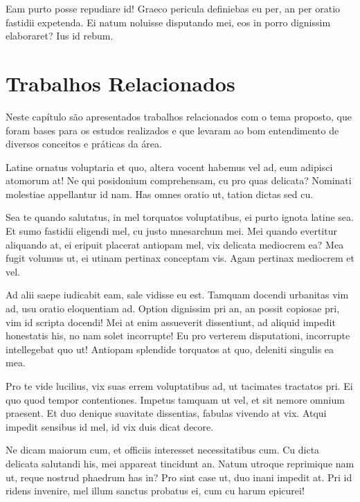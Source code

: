 \documentclass[
	12pt,				%
	openright,			%
	oneside,			%
	a4paper,			%
	english,			%
	french,				%
	spanish,			%
	brazil,				%
	]{abntex2}
\begin{document}
Eam purto posse repudiare id! Graeco pericula definiebas eu per, an per oratio fastidii expetenda. Ei natum noluisse disputando mei, eos in porro dignissim elaboraret? Ius id rebum.


\chapter{Trabalhos Relacionados}
\label{ch: trabalhos relacionados}

Neste capítulo são apresentados trabalhos relacionados com o tema proposto, que foram bases para os estudos realizados e que levaram ao bom entendimento de diversos conceitos e práticas da área.

Latine ornatus voluptaria et quo, altera vocent habemus vel ad, eum adipisci atomorum at! Ne qui posidonium comprehensam, cu pro quas delicata? Nominati molestiae appellantur id nam. Has omnes oratio ut, tation dictas sed cu.

Sea te quando salutatus, in mel torquatos voluptatibus, ei purto ignota latine sea. Et sumo fastidii eligendi mel, cu justo mnesarchum mei. Mei quando evertitur aliquando at, ei eripuit placerat antiopam mel, vix delicata mediocrem ea? Mea fugit volumus ut, ei utinam pertinax conceptam vis. Agam pertinax mediocrem et vel.

Ad alii saepe iudicabit eam, sale vidisse eu est. Tamquam docendi urbanitas vim ad, usu oratio eloquentiam ad. Option dignissim pri an, an possit copiosae pri, vim id scripta docendi! Mei at enim assueverit dissentiunt, ad aliquid impedit honestatis his, no nam solet incorrupte! Eu pro verterem disputationi, incorrupte intellegebat quo ut! Antiopam splendide torquatos at quo, deleniti singulis ea mea.

Pro te vide lucilius, vix suas errem voluptatibus ad, ut tacimates tractatos pri. Ei quo quod tempor contentiones. Impetus tamquam ut vel, et sit nemore omnium praesent. Et duo denique suavitate dissentias, fabulas vivendo at vix. Atqui impedit sensibus id mel, id vix duis dicat decore.

Ne dicam maiorum cum, et officiis interesset necessitatibus cum. Cu dicta delicata salutandi his, mei appareat tincidunt an. Natum utroque reprimique nam ut, reque nostrud phaedrum has in? Pro sint case ut, duo inani impedit at. Pri id ridens invenire, mel illum sanctus probatus ei, cum cu harum epicurei!
\end{document}
